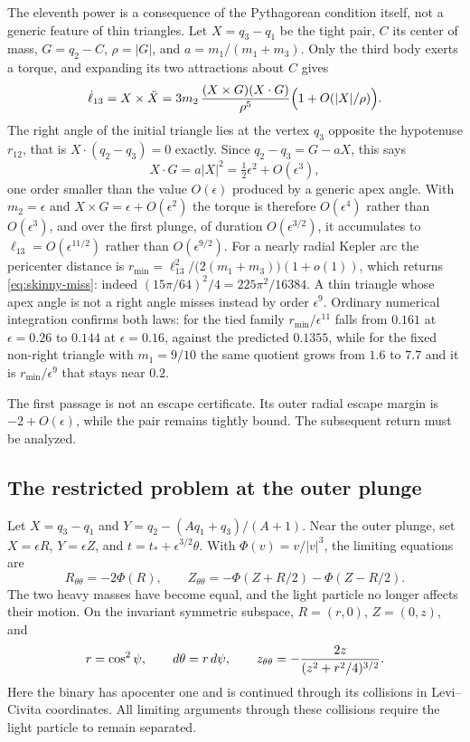 \begin{remark}
\label{rem:right-angle-thin}
The eleventh power is a consequence of the Pythagorean condition itself,
not a generic feature of thin triangles. Let $X=q_3-q_1$ be the tight pair,
$C$ its center of mass, $G=q_2-C$, $\rho=|G|$, and
$a=m_1/(m_1+m_3)$. Only the third body exerts a torque, and expanding its
two attractions about $C$ gives
\[
 \dot\ell_{13}=X\times\ddot X
 =3m_2\,\frac{(X\times G)(X\cdot G)}{\rho^5}
 \Bigl(1+O(|X|/\rho)\Bigr).
\]
The right angle of the initial triangle lies at the vertex $q_3$ opposite
the hypotenuse $r_{12}$, that is $X\cdot(q_2-q_3)=0$ exactly. Since
$q_2-q_3=G-aX$, this says
\[
 X\cdot G=a|X|^2=\tfrac12\epsilon^2+O(\epsilon^3),
\]
one order smaller than the value $O(\epsilon)$ produced by a generic apex
angle. With $m_2=\epsilon$ and $X\times G=\epsilon+O(\epsilon^2)$ the torque
is therefore $O(\epsilon^4)$ rather than $O(\epsilon^3)$, and over the first
plunge, of duration $O(\epsilon^{3/2})$, it accumulates to
$\ell_{13}=O(\epsilon^{11/2})$ rather than $O(\epsilon^{9/2})$. For a
nearly radial Kepler arc the pericenter distance is
$r_{\min}=\ell_{13}^2/\bigl(2(m_1+m_3)\bigr)(1+o(1))$, which returns
\eqref{eq:skinny-miss}: indeed $(15\pi/64)^2/4=225\pi^2/16384$.
A thin triangle whose apex angle is not a right angle misses instead by
order $\epsilon^9$. Ordinary numerical integration confirms both laws: for
the tied family $r_{\min}/\epsilon^{11}$ falls from $0.161$ at
$\epsilon=0.26$ to $0.144$ at $\epsilon=0.16$, against the predicted
$0.1355$, while for the fixed non-right triangle with $m_1=9/10$ the same
quotient grows from $1.6$ to $7.7$ and it is $r_{\min}/\epsilon^9$ that
stays near $0.2$.
\end{remark}

The first passage is not an escape certificate. Its outer radial escape
margin is $-2+O(\epsilon)$, while the pair remains tightly bound. The
subsequent return must be analyzed.

\subsection{The restricted problem at the outer plunge}\label{sec:restricted}

Let $X=q_3-q_1$ and $Y=q_2-(Aq_1+q_3)/(A+1)$. Near the outer
plunge, set $X=\epsilon R$, $Y=\epsilon Z$, and
$t=t_*+\epsilon^{3/2}\theta$. With $\Phi(v)=v/|v|^3$, the limiting
equations are
\begin{equation}\label{eq:restricted}
 R_{\theta\theta}=-2\Phi(R),\qquad
 Z_{\theta\theta}=-\Phi(Z+R/2)-\Phi(Z-R/2).
\end{equation}
The two heavy masses have become equal, and the light particle no longer
affects their motion. On the invariant symmetric subspace,
$R=(r,0)$, $Z=(0,z)$, and
\[
 r=\cos^2\psi,\qquad d\theta=r\,d\psi,\qquad
 z_{\theta\theta}=-{2z\over(z^2+r^2/4)^{3/2}}.
\]
Here the binary has apocenter one and is continued through its collisions
in Levi--Civita coordinates. All limiting arguments through these
collisions require the light particle to remain separated.

